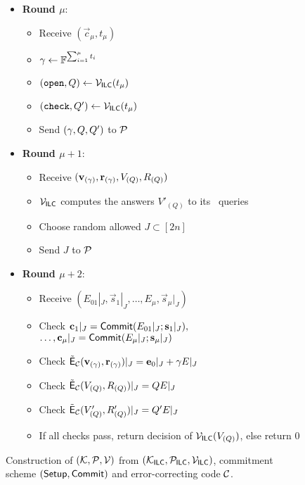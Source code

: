 \begin{figure}[!h]
{\begin{minipage}[t]{6.5cm}
\begin{algorithm}[H]
\begin{itemize}
\begin{itemize}
\item Send $x_\roundnum$ to $\Po$ 
\end{itemize}
\item \textbf{Round $\mu$}: 
\begin{itemize}
\item Receive $(\vec{c}_\mu,t_{\mu})$
\item ${\mathbf{\gamma}}\gets \mathbb{F}^{\sum_{i=1}^\mu t_i}$
\item $(\texttt{open},Q)\gets \mathcal{V}_{\mathsf{ILC}}(t_\mu)$
\item $(\texttt{check},Q')\gets \mathcal{V}_{\mathsf{ILC}}(t_\mu)$
\item Send $({\mathbf{\gamma}},Q,Q')$ to $\Po$ 
\end{itemize} 
\item\textbf{Round $\mu+1$}: 
\begin{itemize}
\item Receive $(\mathbf{v}_{({\mathbf{\gamma}})},\mathbf{r}_{({\mathbf{\gamma}})},V_{(Q)},R_{(Q)})$
\item $\mathcal{V}_{\mathsf{ILC}}$ computes the answers $V'_{(Q)}$ to its \ILCcheck\ queries
\item Choose random allowed $J\subset [2n]$
\item Send $J$ to $\Po$ %
\end{itemize}
\item \textbf{Round $\mu+2$}:
\begin{itemize}
\item Receive $(E_{01}|_J,\vec{s}_1|_J,\ldots,E_\mu,\vec{s}_\mu|_J)$
\item Check $\mathbf{c}_1|_J=\mathsf{Commit}(E_{01}|_J;\mathbf{s}_1|_J),$\\ $\ldots,\mathbf{c}_\mu|_J=\mathsf{Commit}(E_\mu|_J;\mathbf{s}_\mu|_J)$
\item Check $\tilde{\mathsf{E}}_{\mathcal{C}}(\mathbf{v}_{({\mathbf{\gamma}})},\mathbf{r}_{({\mathbf{\gamma}})})|_J= \mathbf{e}_0|_J+{\mathbf{\gamma}} E|_J$
\item Check $\tilde{\mathsf{E}}_{\mathcal{C}}(V_{(Q)},R_{(Q)})|_J= Q E|_J$
\item Check $\tilde{\mathsf{E}}_{\mathcal{C}}(V'_{(Q)},R'_{(Q)})|_J= Q' E|_J$
\item If all checks pass, return decision of $\mathcal{V}_{\mathsf{ILC}}(V_{(Q)})$, else return 0
\end{itemize}
\end{itemize}
\end{algorithm}
\end{minipage}}
\caption{Construction of $(\mathcal{K},\mathcal{P},\mathcal{V})$ from $(\mathcal{K}_{\mathsf{ILC}},\mathcal{P}_{\mathsf{ILC}},\mathcal{V}_{\mathsf{ILC}})$, commitment scheme $(\mathsf{Setup},\mathsf{Commit})$ and error-correcting code $\mathcal{C}$.}
\label{fig:defILCtoIOP}
\end{figure}

